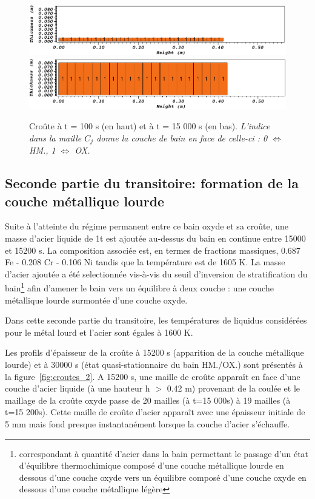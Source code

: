 \begin{figure}[H]
\centering
\includegraphics[width=\textwidth, keepaspectratio=true]{Figures/croute_100.png}\\
\includegraphics[width=\textwidth, keepaspectratio=true]{Figures/croute_15000.png}
\caption{Croûte à t = 100 s (en haut) et à t = 15 000 s (en bas). \textit{L'indice dans la maille $C_j$ donne la couche de bain en face de celle-ci : 0 $\Leftrightarrow$ HM., 1 $\Leftrightarrow$ OX.}}
\label{fig:croutes_1}
\end{figure}

\subsection{Seconde partie du transitoire: formation de la couche métallique lourde}

Suite à l'atteinte du régime permanent entre ce bain oxyde et sa croûte, une masse d'acier liquide de 1t est ajoutée au-dessus du bain en continue entre 15000 et 15200 s. La composition associée est, en termes de fractions massiques, 0.687 Fe - 0.208 Cr - 0.106 Ni tandis que la température est de 1605 K. La masse d'acier ajoutée a été selectionnée vis-à-vis du seuil d'inversion de stratification du bain\footnote{correspondant à quantité d'acier dans la bain permettant le passage d'un état d'équilibre thermochimique composé d'une couche métallique lourde en dessous d'une couche oxyde vers un équilibre composé d'une couche oxyde en dessous d'une couche métallique légère} afin d'amener le bain vers un équilibre à deux couche : une couche métallique lourde surmontée d'une couche oxyde.

Dans cette seconde partie du transitoire, les températures de liquidus considérées pour le métal lourd et l'acier sont égales à 1600 K.

Les profils d'épaisseur de la croûte à 15200 s (apparition de la couche métallique lourde) et à 30000 s (état quasi-stationnaire du bain HM./OX.) sont présentés à la figure~\ref{fig:croutes_2}.
A 15200 s, une maille de croûte apparaît en face d'une couche d'acier liquide (à une hauteur h $>$ 0.42 m) provenant de la coulée et le maillage de la croûte oxyde passe de 20 mailles (à t=15 000s) à 19 mailles (à t=15 200s). Cette maille de croûte d'acier apparaît avec une épaisseur initiale de 5 mm mais fond presque instantanément lorsque la couche d'acier s'échauffe. 

